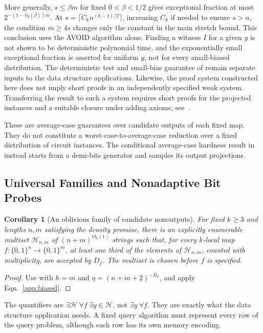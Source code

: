 \documentclass[letterpaper,11pt]{article}
\newtheorem{corollary}[theorem]{Corollary}
\theoremstyle{definition}
\begin{document}
More generally, $s\le\beta m$ for fixed $0<\beta<1/2$ gives
exceptional fraction at most $2^{-(1-h_2(\beta))m}$.
At $s=\lceil C_kn^{(k-1)/2}\rceil$, increasing $C_k$ if needed
to ensure $s>n$, the condition $m\ge4s$ changes only the constant
in the main stretch bound. This conclusion uses the AVOID
algorithm alone. Finding a witness $I$ for a given $y$ is not
shown to be deterministic polynomial time, and the exponentially
small exceptional fraction is asserted for uniform $y$, not for
every small-biased distribution. The deterministic test and
small-bias guarantee of  remain separate inputs
to the data structure applications. Likewise, the proof system
constructed here does not imply short proofs in an independently
specified weak system. Transferring the result to such a system
requires short proofs for the projected instances and a suitable
closure under adding axioms; see~\cite[Section~4.3]{LRZ26}.

These are average-case guarantees over candidate outputs of each fixed
map. They do not constitute a worst-case-to-average-case reduction
over a fixed distribution of circuit instances. The conditional
average-case hardness result in~\cite[Theorem~4.4]{LRZ26} instead
starts from a demi-bits generator and samples its output projections.

\subsection{Universal Families and Nonadaptive Bit Probes}

\begin{corollary}[An oblivious family of candidate nonoutputs]
\label{cor:universal}
For fixed $k\ge3$ and lengths $n,m$ satisfying the density promise,
there is an explicitly enumerable multiset $\mathcal H_{n,m}$ of
$(n+m)^{O_k(1)}$ strings such that, for every $k$-local map
$f:\{0,1\}^n\to\{0,1\}^m$, at least one third of the elements of
$\mathcal H_{n,m}$, counted with multiplicity, are accepted by $D_f$.
The multiset is chosen before $f$ is specified.
\end{corollary}
\begin{proof}
Use  with $h=m$ and
$\eta=(n+m+2)^{-B_k}$, and apply Eqn.~\eqref{app:biased}.
\end{proof}

The quantifiers are
$\exists\mathcal H\ \forall f\ \exists y\in\mathcal H$,
not $\exists y\ \forall f$. They are exactly what the data structure
application needs. A fixed query algorithm must represent every row
of the query problem, although each row has its own memory encoding.
\end{document}
